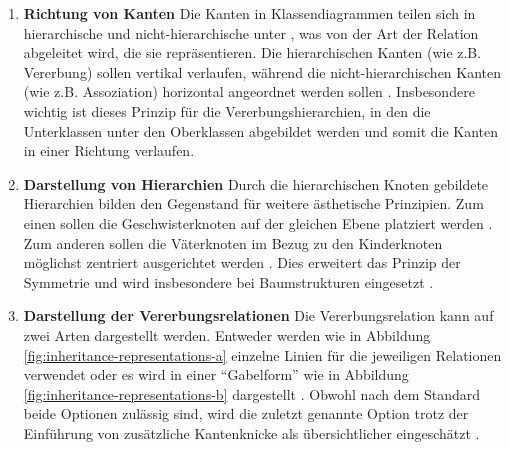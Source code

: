 \begin{enumerate}[label={\aestheticscriterialabel.\arabic*}, resume]

\item
\label{pri:edge-direction}
\textbf{Richtung von Kanten}
Die Kanten in Klassendiagrammen teilen sich in hierarchische und nicht-hierarchische unter \cite{Eichelberger05Aesthetics}, was von der Art der Relation abgeleitet wird, die sie repräsentieren. Die hierarchischen Kanten (wie z.B. Vererbung) sollen vertikal verlaufen, während die nicht-hierarchischen Kanten (wie z.B. Assoziation) horizontal angeordnet werden sollen \cite{EichelbergerSchmid09Guidelines, Ambler05The-Elements}. Insbesondere wichtig ist dieses Prinzip für die Vererbungshierarchien, in den die Unterklassen unter den Oberklassen abgebildet werden und somit die Kanten in einer Richtung verlaufen.

\item
\label{pri:hierarchies}
\textbf{Darstellung von Hierarchien}
Durch die hierarchischen Knoten gebildete Hierarchien bilden den Gegenstand für weitere ästhetische Prinzipien. Zum einen sollen die Geschwisterknoten auf der gleichen Ebene platziert werden \cite{Siebenhaller03Automatisches}. Zum anderen sollen die Väterknoten im Bezug zu den Kinderknoten möglichst zentriert ausgerichtet werden \cite{EichelbergerSchmid09Guidelines, Siebenhaller03Automatisches}. Dies erweitert das Prinzip der Symmetrie \cite{EichelbergerSchmid09Guidelines} und wird insbesondere bei Baumstrukturen eingesetzt \cite{Siebenhaller03Automatisches}.

\item
\label{pri:inheritance-relation}
\textbf{Darstellung der Vererbungsrelationen}
Die Vererbungsrelation kann auf zwei Arten dargestellt werden. Entweder werden wie in Abbildung \ref{fig:inheritance-representations-a} einzelne Linien für die jeweiligen Relationen verwendet oder es wird in einer \enquote{Gabelform} wie in Abbildung \ref{fig:inheritance-representations-b} dargestellt \cite{Siebenhaller03Automatisches}. Obwohl nach dem Standard beide Optionen zulässig sind, wird die zuletzt genannte Option trotz der Einführung von zusätzliche Kantenknicke als übersichtlicher eingeschätzt \cite{EichelbergerSchmid09Guidelines, Siebenhaller03Automatisches}.

\vspace{0.5cm}


\end{enumerate}
